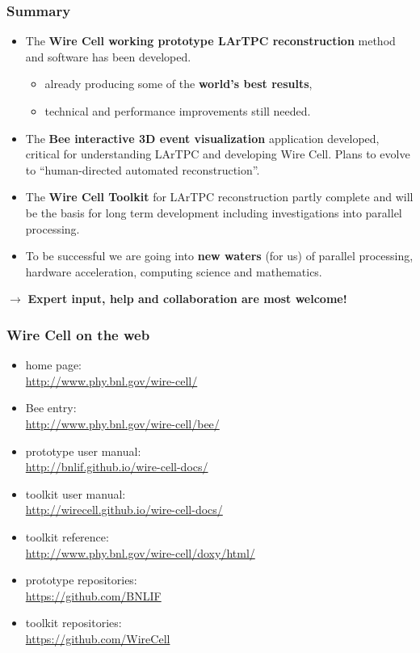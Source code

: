 \documentclass[xcolor=dvipsnames]{beamer}
\begin{document}
\begin{frame}
  \frametitle{Summary}
  \footnotesize
  \begin{itemize}
  \item The \textbf{Wire Cell working prototype LArTPC reconstruction} method and software has been developed.
    \begin{itemize}  \footnotesize
    \item already producing some of the \textbf{world's best results},
    \item technical and performance improvements still needed.
    \end{itemize}
  \item The \textbf{Bee interactive 3D event visualization}
    application developed, critical for understanding LArTPC and
    developing Wire Cell.  Plans to evolve to ``human-directed
    automated reconstruction''.
  \item The \textbf{Wire Cell Toolkit} for LArTPC reconstruction
    partly complete and will be the basis for long term development
    including investigations into parallel processing.
  \item To be successful we are going into \textbf{new waters} (for
    us) of parallel processing, hardware acceleration, computing
    science and mathematics.
  \end{itemize}

  \begin{center}
    $\rightarrow$ \textbf{Expert input, help and collaboration are most welcome!}
  \end{center}
\end{frame}

\begin{frame}
  \frametitle{Wire Cell on the web}

  \begin{itemize}
  \item home page: \\ \url{http://www.phy.bnl.gov/wire-cell/}
  \item Bee entry: \\ \url{http://www.phy.bnl.gov/wire-cell/bee/}
  \item prototype user manual: \\ \url{http://bnlif.github.io/wire-cell-docs/}
  \item toolkit user manual: \\ \url{http://wirecell.github.io/wire-cell-docs/}
  \item toolkit reference: \\ \url{http://www.phy.bnl.gov/wire-cell/doxy/html/}
  \item prototype repositories: \\ \url{https://github.com/BNLIF}
  \item toolkit repositories: \\ \url{https://github.com/WireCell}
  \end{itemize}
\end{frame}
\end{document}
